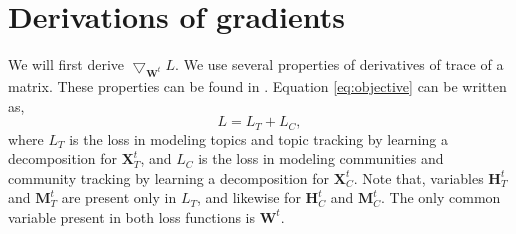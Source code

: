 \documentclass[a4paper,10pt]{article}
\newcommand{\W}{\textbf{W}^t}
\newcommand{\HT}{\textbf{H}^t_T}
\newcommand{\HC}{\textbf{H}^t_C}
\newcommand{\MT}{\textbf{M}^t_T}
\newcommand{\MC}{\textbf{M}^t_C}
\newcommand{\XT}{\textbf{X}^t_T}
\newcommand{\XC}{\textbf{X}^t_C}
\newcommand{\0}{\textbf{0}}
\begin{document}
\section{Derivations of gradients}
\label{sec:gradient}
We will first derive $\bigtriangledown_{\W}L$.  We use several properties of derivatives of trace of a matrix.  These properties
can be found in \cite{matrixcookbook}.  Equation \ref{eq:objective} can be written as,
\begin{equation}
L = L_T + L_C,
\end{equation}
where $L_T$ is the loss in modeling topics and topic tracking by learning a decomposition for $\XT$, and 
$L_C$ is the loss in modeling communities and community tracking by learning a decomposition for $\XC$. Note that,
variables $\HT$ and $\MT$ are present only in $L_T$, and likewise for $\HC$ and $\MC$.  The only common variable
present in both loss functions is $\W$. 
\end{document}
